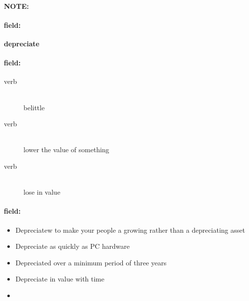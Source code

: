 \documentclass[12pt]{article}
\newenvironment{note}{\paragraph{NOTE:}}{}
\newenvironment{field}{\paragraph{field:}}{}
\begin{document}
\begin{note}
\begin{field}
\textbf{\large depreciate}
\end{field}


\begin{field}
\begin{description}
\item[verb] \hfill \\ 
belittle

\item[verb] \hfill \\ 
lower the value of something

\item[verb] \hfill \\ 
lose in value

\end{description}
\end{field}

\begin{field}
\begin{itemize}
\item Depreciatew to make your people a growing rather than a depreciating asset
\item Depreciate as quickly as PC hardware
\item Depreciated over a minimum period of three years
\item Depreciate in value with time
\item 
\end{itemize}
\end{field}
\end{note}
\end{document}
